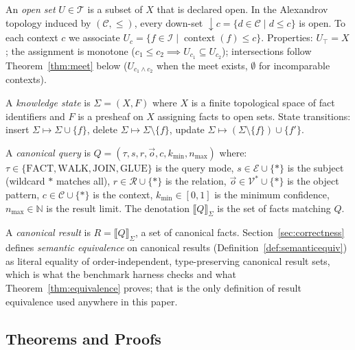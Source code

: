 \begin{definition}
\label{def:openset}
An \emph{open set} $U \in \mathcal{T}$ is a subset of $X$ that is declared open.
In the Alexandrov topology induced by $(\mathcal{C}, \leq)$, every down-set
$\downarrow c = \{d \in \mathcal{C} \mid d \leq c\}$ is open.
To each context $c$ we associate $U_c = \{f \in \mathcal{I} \mid \operatorname{context}(f) \leq c\}$.
Properties: $U_{\top} = X$; the assignment is monotone
($c_1 \leq c_2 \implies U_{c_1} \subseteq U_{c_2}$); intersections follow
Theorem~\ref{thm:meet} below ($U_{c_1 \wedge c_2}$ when the meet exists,
$\emptyset$ for incomparable contexts).
\end{definition}

\begin{definition}
\label{def:knowledgestate}
A \emph{knowledge state} is $\Sigma = (X, F)$ where $X$ is a finite topological space
of fact identifiers and $F$ is a presheaf on $X$ assigning facts to open sets.
State transitions: insert $\Sigma \mapsto \Sigma \cup \{f\}$,
delete $\Sigma \mapsto \Sigma \setminus \{f\}$,
update $\Sigma \mapsto (\Sigma \setminus \{f\}) \cup \{f'\}$.
\end{definition}

\begin{definition}
\label{def:canonicalquery}
A \emph{canonical query} is $Q = (\tau, s, r, \vec{o}, c, k_{\min}, n_{\max})$ where:
$\tau \in \{\text{FACT}, \text{WALK}, \text{JOIN}, \text{GLUE}\}$ is the query mode,
$s \in \mathcal{E} \cup \{\ast\}$ is the subject (wildcard $\ast$ matches all),
$r \in \mathcal{R} \cup \{\ast\}$ is the relation,
$\vec{o} \in \mathcal{V}^* \cup \{\ast\}$ is the object pattern,
$c \in \mathcal{C} \cup \{\ast\}$ is the context,
$k_{\min} \in [0,1]$ is the minimum confidence,
$n_{\max} \in \mathbb{N}$ is the result limit.
The denotation $\llbracket Q \rrbracket_\Sigma$ is the set of facts matching $Q$.
\end{definition}

A \emph{canonical result} is $R = \llbracket Q \rrbracket_\Sigma$, a set of
canonical facts. Section~\ref{sec:correctness} defines \emph{semantic
equivalence} on canonical results (Definition~\ref{def:semanticequiv}) as
literal equality of order-independent, type-preserving canonical result
sets, which is what the benchmark harness checks and what
Theorem~\ref{thm:equivalence} proves; that is the only definition of
result equivalence used anywhere in this paper.

\subsection{Theorems and Proofs}
\label{sec:appendix:theorems}

